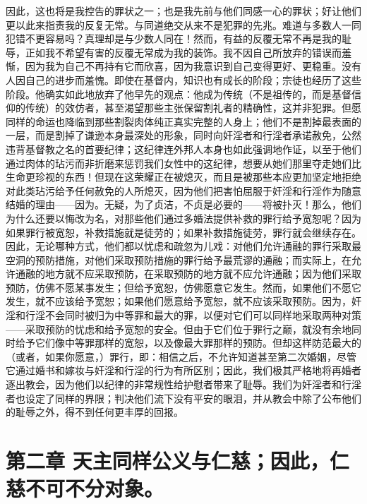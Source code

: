因此，这也将是我控告的罪状之一；也是我先前与他们同感一心的罪状；好让他们更以此来指责我的反复无常。与同道绝交从来不是犯罪的先兆。难道与多数人一同犯错不更容易吗？真理却是与少数人同在！然而，有益的反覆无常不再是我的耻辱，正如我不希望有害的反覆无常成为我的装饰。我不因自己所放弃的错误而羞惭，因为我为自己不再持有它而欣喜，因为我意识到自己变得更好、更稳重。没有人因自己的进步而羞愧。即使在基督内，知识也有成长的阶段；宗徒也经历了这些阶段。他确实如此地放弃了他早先的观点：他成为传统（不是祖传的，而是基督信仰的传统）的效仿者，甚至渴望那些主张保留割礼者的精确性，这并非犯罪。但愿同样的命运也降临到那些割裂肉体纯正真实完整的人身上；他们不是割掉最表面的一层，而是割掉了谦逊本身最深处的形象，同时向奸淫者和行淫者承诺赦免，公然违背基督教之名的首要纪律；这纪律连外邦人本身也如此强调地作证，以至于他们通过肉体的玷污而非折磨来惩罚我们女性中的这纪律，想要从她们那里夺走她们比生命更珍视的东西！但现在这荣耀正在被熄灭，而且是被那些本应更加坚定地拒绝对此类玷污给予任何赦免的人所熄灭，因为他们把害怕屈服于奸淫和行淫作为随意结婚的理由——因为。无疑，为了贞洁，不贞是必要的——将被扑灭！那么，他们为什么还要以悔改为名，对那些他们通过多婚法提供补救的罪行给予宽恕呢？因为如果罪行被宽恕，补救措施就是徒劳的；如果补救措施徒劳，罪行就会继续存在。因此，无论哪种方式，他们都以忧虑和疏忽为儿戏：对他们允许通融的罪行采取最空洞的预防措施，对他们采取预防措施的罪行给予最荒谬的通融；而实际上，在允许通融的地方就不应采取预防，在采取预防的地方就不应允许通融；因为他们采取预防，仿佛不愿某事发生；但给予宽恕，仿佛愿意它发生。然而，如果他们不愿它发生，就不应该给予宽恕；如果他们愿意给予宽恕，就不应该采取预防。因为，奸淫和行淫不会同时被归为中等罪和最大的罪，以便对它们可以同样地采取两种对策——采取预防的忧虑和给予宽恕的安全。但由于它们位于罪行之巅，就没有余地同时给予它们像中等罪那样的宽恕，以及像最大罪那样的预防。但却这样防范最大的（或者，如果你愿意，）罪行，即：相信之后，不允许知道甚至第二次婚姻，尽管它通过婚书和嫁妆与奸淫和行淫的行为有所区别；因此，我们极其严格地将再婚者逐出教会，因为他们以纪律的非常规性给护慰者带来了耻辱。我们为奸淫者和行淫者也设定了同样的界限；判决他们流下没有平安的眼泪，并从教会中除了公布他们的耻辱之外，得不到任何更丰厚的回报。\par


\section{第二章 天主同样公义与仁慈；因此，仁慈不可不分对象。}

